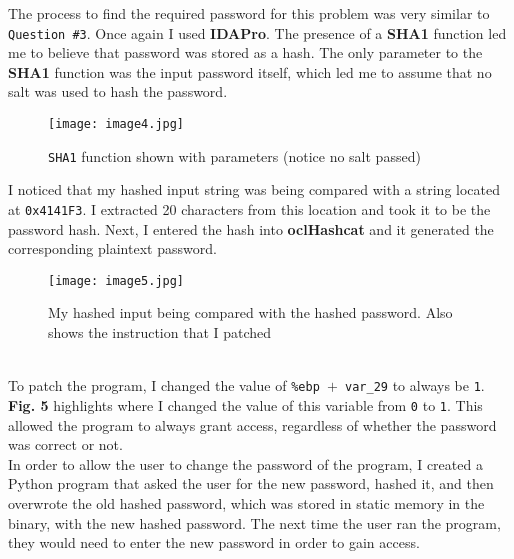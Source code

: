 \documentclass[conference]{IEEEtran}
\begin{document}
The process to find the required password for this problem was very similar to \texttt{Question \#3}. Once again I used \textbf{IDAPro}. The presence of a \textbf{SHA1} function led me to believe that password was stored as a hash. The only parameter to the \textbf{SHA1} function was the input password itself, which led me to assume that no salt was used to hash the password.\\

\begin{figure}[h]
\texttt{[image: image4.jpg]}
\caption{\texttt{SHA1} function shown with parameters (notice no salt passed)}
\centering
\end{figure}\mbox{}

I noticed that my hashed input string was being compared with a string located at \texttt{0x4141F3}. I extracted 20 characters from this location and took it to be the password hash. Next, I entered the hash into \textbf{oclHashcat} and it generated the corresponding plaintext password.

\begin{figure}[h]
\texttt{[image: image5.jpg]}
\caption{My hashed input being compared with the hashed password. Also shows the instruction that I patched}
\centering
\end{figure}\mbox{}\\

To patch the program, I changed the value of \texttt{\%ebp $+$ var\_29} to always be \texttt{1}. \textbf{Fig. 5} highlights where I changed the value of this variable from \texttt{0} to \texttt{1}. This allowed the program to always grant access, regardless of whether the password was correct or not.\\

In order to allow the user to change the password of the program, I created a Python program that asked the user for the new password, hashed it, and then overwrote the old hashed password, which was stored in static memory in the binary, with the new hashed password. The next time the user ran the program, they would need to enter the new password in order to gain access.\\\\

\printbibliography

%
\IEEEpeerreviewmaketitle


\end{document}
